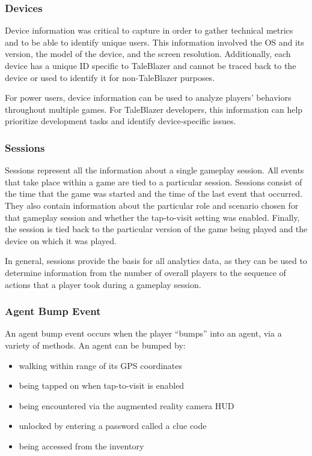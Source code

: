 \subsubsection{Devices}
\label{subsec:device}

Device information was critical to capture in order to gather technical metrics and to be able to identify unique users. This information involved the OS and its version, the model of the device, and the screen resolution. Additionally, each device has a unique ID specific to TaleBlazer and cannot be traced back to the device or used to identify it for non-TaleBlazer purposes. 

For power users, device information can be used to analyze players' behaviors throughout multiple games. For TaleBlazer developers, this information can help prioritize development tasks and identify device-specific issues.

\subsubsection{Sessions}
\label{subsec:session}

Sessions represent all the information about a single gameplay session. All events that take place within a game are tied to a particular session. Sessions consist of the time that the game was started and the time of the last event that occurred. They also contain information about the particular role and scenario chosen for that gameplay session and whether the tap-to-visit setting was enabled. Finally, the session is tied back to the particular version of the game being played and the device on which it was played. 

In general, sessions provide the basis for all analytics data, as they can be used to determine information from the number of overall players to the sequence of actions that a player took during a gameplay session.

\subsubsection{Agent Bump Event}

An agent bump event occurs when the player ``bumps'' into an agent, via a variety of methods. An agent can be bumped by:
	\begin{itemize}
		\item walking within range of its GPS coordinates
		\item being tapped on when tap-to-visit is enabled
		\item being encountered via the augmented reality camera HUD
		\item unlocked by entering a password called a clue code
		\item being accessed from the inventory
	\end{itemize}

